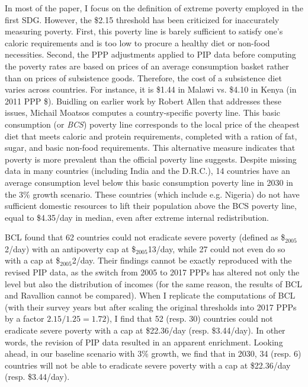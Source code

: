 In most of the paper, I focus on the definition of extreme poverty employed in the first SDG. However, the \$2.15 threshold has been criticized for inaccurately measuring poverty.\cite{woodward_redefining_2010,deaton_price_2010} %
First, this poverty line %
is barely sufficient to satisfy one's caloric requirements and is too low to procure a healthy diet or non-food necessities. 
Second, the PPP adjustments applied to PIP data before computing the poverty rates are based on prices of an average consumption basket rather than on prices of subsistence goods.\cite{sullivan_capitalist_2023} Therefore, the cost of a subsistence diet varies across countries. For instance, it is \$1.44 in Malawi vs. \$4.10 in Kenya (in 2011 PPP \$).\cite{moatsos_global_2016} Buidling on earlier work by Robert Allen that addresses these issues,\cite{allen_absolute_2017} Michail Moatsos computes a country-specific poverty line. This basic consumption (or \textit{BCS}) poverty line corresponds to the local price of the cheapest diet that meets caloric and protein requirements, completed with a ration of fat, sugar, and basic non-food requirements.\cite{moatsos_global_2016,moatsos_global_2021,sullivan_capitalist_2023} This alternative measure indicates that poverty %
is more prevalent than the official poverty line suggests. Despite missing data in many countries (including India and the D.R.C.), 14 countries have an average consumption level below this basic consumption poverty line in 2030 in the 3\% growth scenario. These countries (which include e.g. Nigeria) do not have sufficient domestic resources to lift their population above the BCS poverty line, equal to \$4.35/day in median, even after extreme internal redistribution. 

BCL found that 62 countries could not eradicate severe poverty (defined as \$$_\text{2005}$2/day) with an antipoverty cap at \$$_\text{2005}$13/day, while 27 could not even do so with a cap at \$$_\text{2005}$2/day. 
Their findings cannot be exactly reproduced with the revised PIP data, as the switch from 2005 to 2017 PPPs has altered not only the level but also the distribution of incomes (for the same reason, the results of BCL and Ravallion cannot be compared). 
When I replicate the computations of BCL (with their survey years but after scaling the original thresholds into 2017 PPPs by a factor $2.15/1.25 = 1.72$), I find that 52 (resp. 30) 
countries could not eradicate severe poverty with a cap at \$22.36/day (resp. \$3.44/day). 
In other words, the revision of PIP data resulted in an apparent enrichment. 
Looking ahead, in our baseline scenario with 3\% growth, we find that in 2030, 34 (resp. 6) 
countries will not be able to eradicate severe poverty with a cap at \$22.36/day (resp. \$3.44/day).

